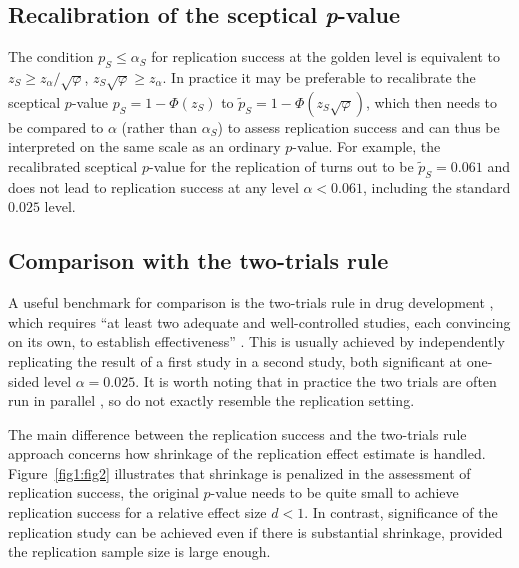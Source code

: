 \subsection{Recalibration of the sceptical \textit{p}-value}\label{sec1:recalib}

The condition $p_S \leq \alpha_S$ for replication success at the golden level is
equivalent to $z_S \geq z_\alpha / \sqrt{\varphi}$, \ie{}
$z_S \sqrt{\varphi} \geq z_\alpha$. In practice it may be preferable to
recalibrate the sceptical $p$-value \mbox{$p_{S} = 1 - \Phi(z_S)$} to
$ \tilde{p}_S = 1 - \Phi(z_S \sqrt{\varphi})$, which then needs to be compared
to $\alpha$ (rather than $\alpha_S$) to assess replication success and can thus
be interpreted on the same scale as an ordinary $p$-value. For example, the
recalibrated sceptical $p$-value for the replication of \citet{Pyc2010} turns
out to be $\tilde{p}_S=0.061$ and does not lead to replication success at any
level $\alpha<0.061$, including the standard $0.025$ level.


\subsection{Comparison with the two-trials rule}\label{sec1:2TR}
A useful benchmark for comparison is the two-trials rule in drug development
\citep[Section 9.4]{Kay2015}, which requires ``at least two adequate and
well-controlled studies, each convincing on its own, to establish
effectiveness'' \citep[p.~3]{FDA1998}. This is usually achieved by independently
replicating the result of a first study in a second study, both significant at
one-sided level $\alpha=0.025$. {It is worth noting that in practice the two
  trials are often run in parallel} {\citep{Senn2008}}{, so do not exactly
  resemble the replication setting.}



The main difference between the replication success and the two-trials
rule approach concerns how shrinkage of the replication effect
estimate is handled. Figure~\ref{fig1:fig2} illustrates that
shrinkage is penalized in the assessment of replication success, \ie{}
the original $p$-value needs to be quite small to achieve replication
success for a relative effect size $d<1$. In contrast, significance of
the replication study can be achieved even if there is substantial
shrinkage, provided the replication sample size is large enough.


